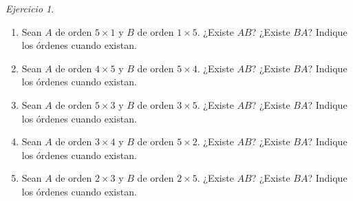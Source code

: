 \documentclass[12pt]{article}
\theoremstyle{remark}
\newtheorem{Ejer}[definicion]{Ejercicio}
\begin{document}
\begin{Ejer}
\begin{enumerate}[start=97]
\item Sean $A$ de orden $5\times1$ y $B$ de orden $1\times5$. ¿Existe $AB$? ¿Existe $BA$? Indique los órdenes cuando existan.

\item Sean $A$ de orden $4\times5$ y $B$ de orden $5\times4$. ¿Existe $AB$? ¿Existe $BA$? Indique los órdenes cuando existan.

\item Sean $A$ de orden $5\times3$ y $B$ de orden $3\times5$. ¿Existe $AB$? ¿Existe $BA$? Indique los órdenes cuando existan.

\item Sean $A$ de orden $3\times4$ y $B$ de orden $5\times2$. ¿Existe $AB$? ¿Existe $BA$? Indique los órdenes cuando existan.

\item Sean $A$ de orden $2\times3$ y $B$ de orden $2\times5$. ¿Existe $AB$? ¿Existe $BA$? Indique los órdenes cuando existan.

\end{enumerate}
\end{Ejer}
\end{document}
